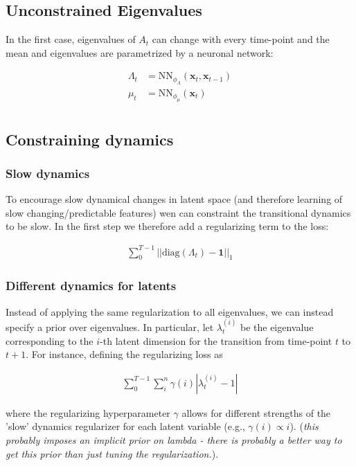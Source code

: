 \subsection{Unconstrained Eigenvalues}

In the first case, eigenvalues of $A_t$ can change with every time-point and the mean and eigenvalues are parametrized by a neuronal network:

\begin{align*}
    \Lambda_t & = \text{NN}_\phi_\Lambda(\textbf{x}_t, \textbf{x}_{t-1}) \\
    \mu_t & = \text{NN}_\phi_\mu(\textbf{x}_t) \\
\end{align*}

\subsection{Constraining dynamics}

\subsubsection{Slow dynamics}

To encourage slow dynamical changes in latent space (and therefore learning of slow changing/predictable features) wen can  constraint the transitional dynamics to be slow. In the first step we therefore add a regularizing term to the loss:

\begin{align*}
    \sum_0^{T-1} ||\text{diag}(\Lambda_t) - \mathbf{1}||_1
\end{align*}

\subsubsection{Different dynamics for latents}

Instead of applying the same regularization to all eigenvalues, we can instead specify a prior over eigenvalues. In particular, let $\lambda^{(i)}_t$ be the eigenvalue corresponding to the $i$-th latent dimension for the transition from time-point $t$ to $t+1$. For instance, defining the regularizing loss as 

\begin{align*}
    \sum_0^{T-1} \sum_i^{n} \gamma(i) |\lambda^{(i)}_t - 1|
\end{align*}

where the regularizing hyperparameter $\gamma$ allows for different strengths of the 'slow' dynamics regularizer for each latent variable (e.g., $\gamma(i) \propto i$). (\textit{this probably imposes an implicit prior on lambda - there is probably a better way to get this prior than just tuning the regularization.}).

